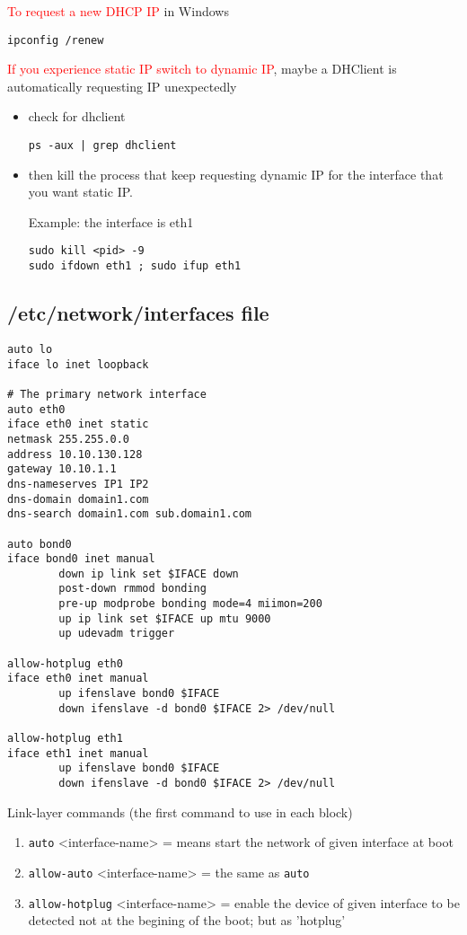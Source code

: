 \textcolor{red}{To request a new DHCP IP } in Windows
\begin{verbatim}
ipconfig /renew
\end{verbatim}

\textcolor{red}{If you experience static IP switch to dynamic IP}, maybe a
DHClient is automatically requesting IP unexpectedly
\begin{itemize}
  \item check for dhclient 
  
\begin{verbatim}
ps -aux | grep dhclient
\end{verbatim}

  \item then kill the process that keep requesting dynamic IP for the interface
  that you want static IP.

Example: the interface is eth1
\begin{verbatim}
sudo kill <pid> -9
sudo ifdown eth1 ; sudo ifup eth1
\end{verbatim}
\end{itemize}

\subsection{/etc/network/interfaces file}
\label{sec:network-interface}

\begin{verbatim}
auto lo
iface lo inet loopback

# The primary network interface
auto eth0
iface eth0 inet static
netmask 255.255.0.0
address 10.10.130.128
gateway 10.10.1.1
dns-nameserves IP1 IP2
dns-domain domain1.com
dns-search domain1.com sub.domain1.com

auto bond0
iface bond0 inet manual
        down ip link set $IFACE down
        post-down rmmod bonding
        pre-up modprobe bonding mode=4 miimon=200
        up ip link set $IFACE up mtu 9000
        up udevadm trigger

allow-hotplug eth0
iface eth0 inet manual
        up ifenslave bond0 $IFACE
        down ifenslave -d bond0 $IFACE 2> /dev/null

allow-hotplug eth1
iface eth1 inet manual
        up ifenslave bond0 $IFACE
        down ifenslave -d bond0 $IFACE 2> /dev/null
\end{verbatim}

Link-layer commands (the first command to use in each block)
\begin{enumerate}
  \item \verb!auto! <interface-name> = means start the network of given
  interface at boot
  
  \item \verb!allow-auto! <interface-name> = the same as \verb!auto! 
  
  \item \verb!allow-hotplug! <interface-name> = enable the device of given
  interface to be detected not at the begining of the boot; but as 'hotplug'
 
\end{enumerate}  

